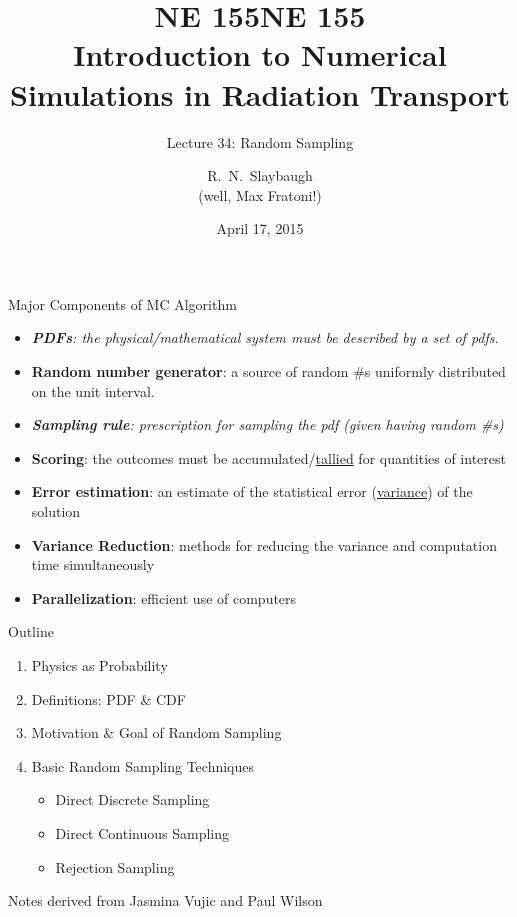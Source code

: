 \documentclass[xcolor=x11names,compress]{beamer}
\title{NE 155}
\author{R.\ N.\ Slaybaugh \\
(well, Max Fratoni!)}
\date{April 17, 2015}
\renewcommand{\(}{\begin{columns}}
\renewcommand{\)}{\end{columns}}
\newcommand{\<}[1]{\begin{column}{#1}}
\renewcommand{\>}{\end{column}}
\begin{document}
\begin{frame}
\title{NE 155\\Introduction to Numerical Simulations in Radiation Transport}
\subtitle{Lecture 34: Random Sampling}
\titlepage
\end{frame}


\begin{frame}{Major Components of MC Algorithm}

\begin{itemize}
  \item \textit{\textbf{PDFs}: the physical/mathematical system must be described by a set of pdfs.}
  \item \textbf{Random number generator}: a source of random \#s uniformly distributed on the unit interval.
  \item \textit{\textbf{Sampling rule}: prescription for sampling the pdf (given having random \#s)}
  \item \textbf{Scoring}: the outcomes must be accumulated/\underline{tallied} for quantities of interest
  \item \textbf{Error estimation}: an estimate of the statistical error (\underline{variance}) of the solution
  \item \textbf{Variance Reduction}: methods for reducing the variance and computation time simultaneously
  \item \textbf{Parallelization}: efficient use of computers
\end{itemize}
\end{frame}


\begin{frame}{Outline}

    \begin{enumerate}
    \item Physics as Probability
    \item Definitions: PDF \& CDF
    \item Motivation \& Goal of Random Sampling
    \item Basic Random Sampling Techniques
      \begin{itemize}
        \item Direct Discrete Sampling
        \item Direct Continuous Sampling
        \item Rejection Sampling
      \end{itemize}
    \end{enumerate}

\vspace*{1em}
Notes derived from Jasmina Vujic and Paul Wilson
\end{frame}
\end{document}
